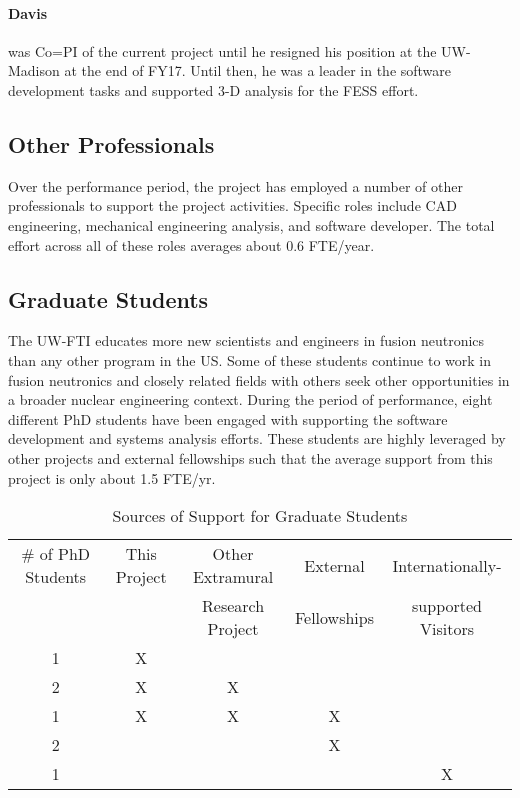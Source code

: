 \paragraph{Davis} was Co=PI of the current project until he resigned his
position at the UW-Madison at the end of FY17.  Until then, he was a leader in
the software development tasks and supported 3-D analysis for the \gls{FESS}
effort.

\subsection{Other Professionals}

Over the performance period, the project has employed a number of other
professionals to support the project activities.  Specific roles include CAD
engineering, mechanical engineering analysis, and software developer.  The
total effort across all of these roles averages about 0.6 FTE/year.

\subsection{Graduate Students}

The \gls{UW-FTI} educates more new scientists and engineers in fusion
neutronics than any other program in the US.  Some of these students continue
to work in fusion neutronics and closely related fields with others seek other
opportunities in a broader nuclear engineering context. During the period of
performance, eight different PhD students have been engaged with supporting
the software development and systems analysis efforts.  These students are
highly leveraged by other projects and external fellowships such that the
average support from this project is only about 1.5 FTE/yr.

\begin{table*}[h]
  \centering
  \caption{Sources of Support for Graduate Students}
  \begin{tabular}{|c|c|c|c|c|}\hline
    \# of PhD Students & This Project & Other Extramural  & External    & Internationally- \\
    &              & Research Project  & Fellowships & supported Visitors    \\\hline
    1 & X &   &   &   \\\hline
    2 & X & X &   &   \\\hline
    1 & X & X & X &   \\\hline
    2 &   &   & X &   \\\hline
    1 &   &   &   & X \\\hline
  \end{tabular}
\end{table*}

